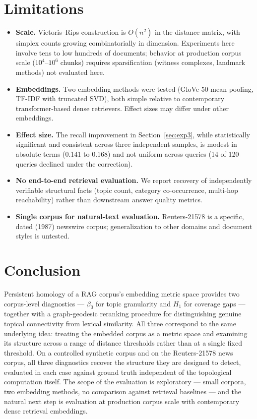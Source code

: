 \documentclass[11pt]{article}
\begin{document}
\section{Limitations}

\begin{itemize}
\item \textbf{Scale.} Vietoris--Rips construction is $O(n^2)$ in the distance matrix, with simplex counts growing combinatorially in dimension. Experiments here involve tens to low hundreds of documents; behavior at production corpus scale ($10^4$--$10^6$ chunks) requires sparsification (witness complexes, landmark methods) not evaluated here.
\item \textbf{Embeddings.} Two embedding methods were tested (GloVe-50 mean-pooling, TF-IDF with truncated SVD), both simple relative to contemporary transformer-based dense retrievers. Effect sizes may differ under other embeddings.
\item \textbf{Effect size.} The recall improvement in Section~\ref{sec:exp3}, while statistically significant and consistent across three independent samples, is modest in absolute terms (0.141 to 0.168) and not uniform across queries (14 of 120 queries declined under the correction).
\item \textbf{No end-to-end retrieval evaluation.} We report recovery of independently verifiable structural facts (topic count, category co-occurrence, multi-hop reachability) rather than downstream answer quality metrics.
\item \textbf{Single corpus for natural-text evaluation.} Reuters-21578 is a specific, dated (1987) newswire corpus; generalization to other domains and document styles is untested.
\end{itemize}

\section{Conclusion}

Persistent homology of a RAG corpus's embedding metric space provides two corpus-level diagnostics — $\beta_0$ for topic granularity and $H_1$ for coverage gaps — together with a graph-geodesic reranking procedure for distinguishing genuine topical connectivity from lexical similarity. All three correspond to the same underlying idea: treating the embedded corpus as a metric space and examining its structure across a range of distance thresholds rather than at a single fixed threshold. On a controlled synthetic corpus and on the Reuters-21578 news corpus, all three diagnostics recover the structure they are designed to detect, evaluated in each case against ground truth independent of the topological computation itself. The scope of the evaluation is exploratory — small corpora, two embedding methods, no comparison against retrieval baselines — and the natural next step is evaluation at production corpus scale with contemporary dense retrieval embeddings.
\end{document}
